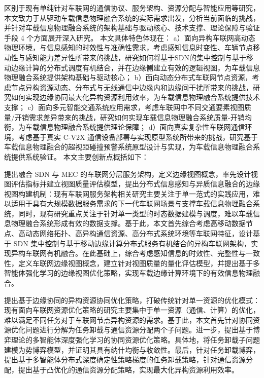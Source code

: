 区别于现有单纯针对车联网的通信协议、服务架构、资源分配与智能应用等研究，本文致力于从驱动车载信息物理融合系统的实际需求出发，分析当前面临的挑战，并针对车载信息物理融合系统的架构基础与驱动核心、技术支撑、理论保障与验证手段 4 个方面展开深入研究。
本文具体特色体现在：
a）面向异构车联网高动态物理环境，与信息感知的时效性与准确性需求，考虑感知信息时变性、车辆节点移动性与感知能力差异性所带来的挑战，研究如何将基于SDN的集中控制与基于移动边缘计算的分布式调度有机结合，并在边缘侧建立有效的逻辑视图，为车载信息物理融合系统提供架构基础与驱动核心；
b）面向动态分布式车联网节点资源，考虑节点异构资源动态、分布式与无线通信中边缘内和边缘间干扰所带来的挑战，研究如何实现边缘协同最大化异构资源利用效率，为车载信息物理融合系统提供技术支撑；
c）面向多元智能交通系统应用需求，考虑车联网中不同交通要素视图质量/开销需求差异带来的挑战，研究如何实现车载信息物理融合系统质量-开销均衡，为车载信息物理融合系统提供理论保障；
d）面向真实复杂性车联网通信环境，考虑基于真实 C-V2X 通信设备部署与实现原型系统所带来的挑战，研究基于车载信息物理融合的超视距碰撞预警系统原型设计与实现，为车载信息物理融合系统提供系统验证。
本文主要创新点概括如下：

 提出融合 SDN 与 MEC 的车联网分层服务架构，定义边缘视图概念，率先设计视图评估指标并建立视图质量评估模型，提出分布式信息感知与异质信息融合的边缘视图构建机制：现有车联网服务架构相关研究主要关注于单一范式的实践应用，难以适用于具有大规模数据服务需求的下一代车联网场景与支撑车载信息物理融合系统，同时，现有研究重点关注于针对单一类型的时态数据建模与调度，难以车载信息物理融合系统形成有效的数据支撑。基于此，本文首先综合考虑高移动数据节点、高动态网络拓扑、高异构通信资源、高分布式系统环境等车联网特征，设计基于 SDN 集中控制与基于移动边缘计算分布式服务有机结合的异构车联网架构，实现异构车联网有机融合。在此基础上，综合考虑感知信息的时效性、完整性与一致性，定义车联网边缘视图概念，建立针对视图质量的量化评估模型，并提出基于多智能体强化学习的边缘视图优化策略，实现车载边缘计算环境下的有效信息物理融合。


 提出基于边缘协同的异构资源协同优化策略，打破传统针对单一资源的优化模式：现有面向车联网资源优化策略的研究主要集中于单一资源（通信、计算）的优化，难以满足不同任务对于车联网节点异构资源的需求。基于此，本文首先针对协同资源优化问题进行分解为任务卸载与通信资源分配两个子问题。进一步，提出基于博弈理论的多智能体深度强化学习的协同资源优化策略。具体地，将任务卸载子问题建模为势博弈模型，并证明其具有纳什均衡与收敛性。最后，针对任务卸载博弈，提出基于多智能体分布式深度确定性策略梯度的任务卸载策略，针对通信资源分配，提出基于凸优化的通信资源分配策略，实现最大化异构资源利用效率。

